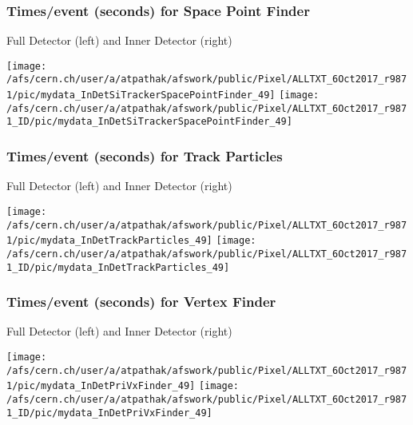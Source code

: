 \documentclass{beamer}
\begin{document}
\begin{frame}
\frametitle{Times/event (seconds) for Space Point Finder}
\begin{center}
\begin{normalsize}
Full Detector (left)  and Inner Detector (right) \\
\vspace*{-.2cm}
\begin{center}
\texttt{[image: /afs/cern.ch/user/a/atpathak/afswork/public/Pixel/ALLTXT\_6Oct2017\_r9871/pic/mydata\_InDetSiTrackerSpacePointFinder\_49]}
\texttt{[image: /afs/cern.ch/user/a/atpathak/afswork/public/Pixel/ALLTXT\_6Oct2017\_r9871\_ID/pic/mydata\_InDetSiTrackerSpacePointFinder\_49]}

\end{center}
\end{normalsize}
\end{center}
\end{frame}
\begin{frame}
\frametitle{Times/event (seconds) for Track Particles}
\begin{center}
\begin{normalsize}
Full Detector (left)  and Inner Detector (right) \\
\vspace*{-.2cm}
\begin{center}
\texttt{[image: /afs/cern.ch/user/a/atpathak/afswork/public/Pixel/ALLTXT\_6Oct2017\_r9871/pic/mydata\_InDetTrackParticles\_49]}
\texttt{[image: /afs/cern.ch/user/a/atpathak/afswork/public/Pixel/ALLTXT\_6Oct2017\_r9871\_ID/pic/mydata\_InDetTrackParticles\_49]}

\end{center}
\end{normalsize}
\end{center}
\end{frame}
\begin{frame}
\frametitle{Times/event (seconds) for Vertex Finder}
\begin{center}
\begin{normalsize}
Full Detector (left)  and Inner Detector (right) \\
\vspace*{-.2cm}
\begin{center}
\texttt{[image: /afs/cern.ch/user/a/atpathak/afswork/public/Pixel/ALLTXT\_6Oct2017\_r9871/pic/mydata\_InDetPriVxFinder\_49]}
\texttt{[image: /afs/cern.ch/user/a/atpathak/afswork/public/Pixel/ALLTXT\_6Oct2017\_r9871\_ID/pic/mydata\_InDetPriVxFinder\_49]}

\end{center}
\end{normalsize}
\end{center}
\end{frame}
\end{document}
